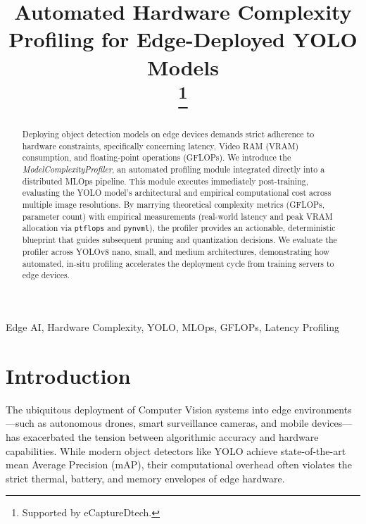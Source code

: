 \documentclass[conference]{IEEEtran}
\begin{document}
\title{Automated Hardware Complexity Profiling for Edge-Deployed YOLO Models\\
\thanks{Supported by eCaptureDtech.}
}

\author{
}

\maketitle

\begin{abstract}
Deploying object detection models on edge devices demands strict adherence to hardware constraints, specifically concerning latency, Video RAM (VRAM) consumption, and floating-point operations (GFLOPs). We introduce the \textit{ModelComplexityProfiler}, an automated profiling module integrated directly into a distributed MLOps pipeline. This module executes immediately post-training, evaluating the YOLO model's architectural and empirical computational cost across multiple image resolutions. By marrying theoretical complexity metrics (GFLOPs, parameter count) with empirical measurements (real-world latency and peak VRAM allocation via \texttt{ptflops} and \texttt{pynvml}), the profiler provides an actionable, deterministic blueprint that guides subsequent pruning and quantization decisions. We evaluate the profiler across YOLOv8 nano, small, and medium architectures, demonstrating how automated, in-situ profiling accelerates the deployment cycle from training servers to edge devices.
\end{abstract}

\begin{IEEEkeywords}
Edge AI, Hardware Complexity, YOLO, MLOps, GFLOPs, Latency Profiling
\end{IEEEkeywords}

\section{Introduction}
The ubiquitous deployment of Computer Vision systems into edge environments—such as autonomous drones, smart surveillance cameras, and mobile devices—has exacerbated the tension between algorithmic accuracy and hardware capabilities. While modern object detectors like YOLO achieve state-of-the-art mean Average Precision (mAP), their computational overhead often violates the strict thermal, battery, and memory envelopes of edge hardware.
\end{document}
